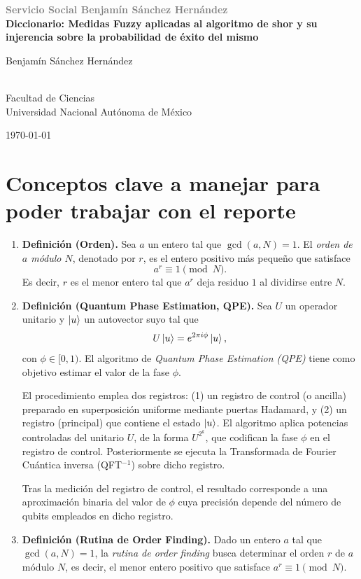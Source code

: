 \documentclass[letterpaper]{article}
\title{\mytitle}
\author{\myauthor}
\date{\thedate}
\newcommand{\mytitle}%
	{Servicio Social Benjamín Sánchez Hernández}
\newcommand{\mysubtitle}%
	{Diccionario: Medidas Fuzzy aplicadas al algoritmo de shor y su injerencia sobre la probabilidad de éxito del mismo}
\newcommand{\myauthor}
    {Benjamín Sánchez Hernández\\}
\newcommand{\thedate}%
	{\today}
\newcommand{\firstinstitute}%
	{Facultad de Ciencias}
\newcommand{\secondinstitute}%
	{Universidad Nacional Autónoma de México}
\newcommand{\emphcolor}{gray}%
\newcommand{\cover}{%
	\thispagestyle{plain}
	\begin{center}
		\Large\textbf{\textcolor{\emphcolor}{\mytitle}} \\
		\LARGE\textbf{\mysubtitle}
		\bigskip
		
		\normalsize\myauthor \\
		\small\myemail
		\medskip
		
		\normalsize\firstinstitute \\ 
		\secondinstitute
		\medskip
		
		\normalsize\thedate \\
	\end{center}%
}
\begin{document}
	
	\unspacedoperators
	
	
	\phantom{.}
	\cover




	




	\section{Conceptos clave a manejar para poder trabajar con el reporte}


\begin{enumerate}
    \item \textbf{Definición (Orden).} 
    Sea $a$ un entero tal que $\gcd(a,N)=1$. 
    El \emph{orden de $a$ módulo $N$}, denotado por $r$, es el entero positivo más pequeño que satisface
    \[
    a^{r} \equiv 1 \pmod{N}.
    \]
    Es decir, $r$ es el menor entero tal que $a^{r}$ deja residuo $1$ al dividirse entre $N$.

    \item \textbf{Definición (Quantum Phase Estimation, QPE).}
    Sea $U$ un operador unitario y $\ket{u}$ un autovector suyo tal que
    \[
    U\ket{u} = e^{2\pi i \phi}\ket{u},
    \]
    con $\phi \in [0,1)$. El algoritmo de \emph{Quantum Phase Estimation (QPE)} tiene como objetivo estimar el valor de la fase $\phi$.

    El procedimiento emplea dos registros: (1) un registro de control (o ancilla) preparado en superposición uniforme mediante puertas Hadamard, y (2) un registro (principal) que contiene el estado $\ket{u}$. El algoritmo aplica potencias controladas del unitario $U$, de la forma $U^{2^k}$, que codifican la fase $\phi$ en el registro de control. Posteriormente se ejecuta la Transformada de Fourier Cuántica inversa (QFT$^{-1}$) sobre 
    dicho registro.

    Tras la medición del registro de control, el resultado corresponde a una aproximación binaria del valor de $\phi$ cuya precisión depende del 
    número de qubits empleados en dicho registro.

    \item \textbf{Definición (Rutina de Order Finding).}
Dado un entero $a$ tal que $\gcd(a,N)=1$, la \emph{rutina de order finding} busca determinar el orden $r$ de $a$ módulo $N$, es decir, el menor entero positivo que satisface $a^{r} \equiv 1 \pmod{N}$.


\end{enumerate}
\end{document}
